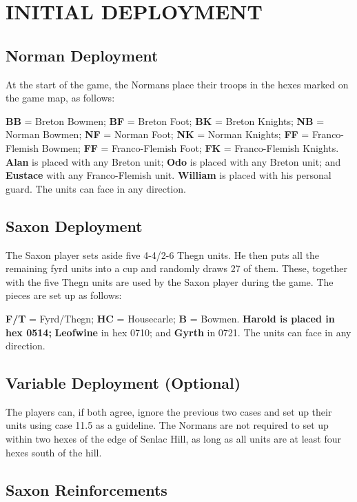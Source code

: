 \section{INITIAL DEPLOYMENT}

\subsection{Norman Deployment}

At the start of the game, the Normans place their troops in the hexes marked on the game map, as follows:

\textbf{BB} = Breton Bowmen; \textbf{BF} = Breton Foot; \textbf{BK} = Breton Knights; \textbf{NB} = Norman Bowmen; \textbf{NF} = Norman Foot; \textbf{NK} = Norman Knights; \textbf{FF} = Franco-Flemish Bowmen; \textbf{FF} = Franco-Flemish Foot; \textbf{FK} = Franco-Flemish Knights. \textbf{Alan} is placed with any Breton unit; \textbf{Odo} is placed with any Breton unit; and \textbf{Eustace} with any Franco-Flemish unit. \textbf{William} is placed with his personal guard. The units can face in any direction.

\subsection{Saxon Deployment}

The Saxon player sets aside five 4-4/2-6 Thegn units. He then puts all the remaining fyrd units into a cup and randomly draws 27 of them. These, together with the five Thegn units are used by the Saxon player during the game. The pieces are set up as follows:

\textbf{F/T} = Fyrd/Thegn; \textbf{HC} = Housecarle; \textbf{B} = Bowmen. \textbf{Harold is placed in hex 0514;} \textbf{Leofwine} in hex 0710; and \textbf{Gyrth} in 0721. The units can face in any direction.

\subsection{Variable Deployment (Optional)}

The players can, if both agree, ignore the previous two cases and set up their units using case 11.5 as a guideline. The Normans are not required to set up within two hexes of the edge of Senlac Hill, as long as all units are at least four hexes south of the hill.

\subsection{Saxon Reinforcements}

